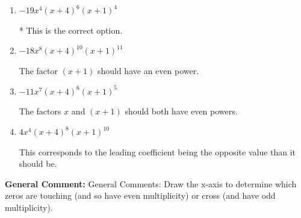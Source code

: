 \documentclass{extbook}[14pt]
\begin{document}
\begin{enumerate}
{\begin{enumerate}[label=\Alph*.]
The factor $(x + 1)$ should have an even power and the leading coefficient should be the opposite sign.
\item \( -19x^{4} (x + 4)^{6} (x + 1)^{4} \)

* This is the correct option.
\item \( -18x^{8} (x + 4)^{10} (x + 1)^{11} \)

The factor $(x + 1)$ should have an even power.
\item \( -11x^{7} (x + 4)^{6} (x + 1)^{5} \)

The factors $x$ and $(x + 1)$ should both have even powers.
\item \( 4x^{4} (x + 4)^{8} (x + 1)^{10} \)

This corresponds to the leading coefficient being the opposite value than it should be.
\end{enumerate}

\textbf{General Comment:} General Comments: Draw the x-axis to determine which zeros are touching (and so have even multiplicity) or cross (and have odd multiplicity).
}
\end{enumerate}
\end{document}
